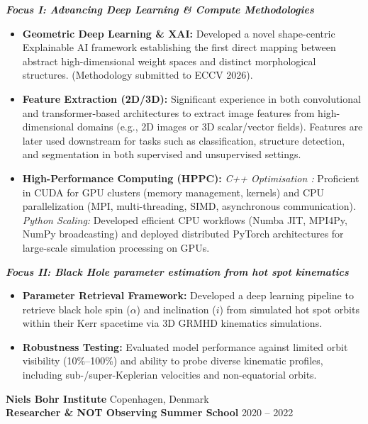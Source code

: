 \documentclass[11pt]{article}
\begin{document}
\vspace{3pt}
\noindent\textit{\textbf{Focus I: Advancing Deep Learning \& Compute Methodologies}}
\begin{itemize}[noitemsep, topsep=2pt, partopsep=0pt, parsep=2pt, leftmargin=1.5em]
    \item \textbf{Geometric Deep Learning \& XAI:} Developed a novel shape-centric Explainable AI framework establishing the first direct mapping between abstract high-dimensional weight spaces and distinct morphological structures. (Methodology submitted to ECCV 2026).
    
    \item \textbf{Feature Extraction (2D/3D):} Significant experience in both convolutional and transformer-based architectures to extract image features from high-dimensional domains (e.g., 2D images or 3D scalar/vector fields). Features are later used downstream for tasks such as classification, structure detection, and segmentation in both supervised and unsupervised settings.
    
    \item \textbf{High-Performance Computing (HPPC):} \textit{C++ Optimisation :} Proficient in CUDA for GPU clusters (memory management, kernels) and CPU parallelization (MPI, multi-threading, SIMD, asynchronous communication). \textit{Python Scaling:} Developed efficient CPU workflows (Numba JIT, MPI4Py, NumPy broadcasting) and deployed distributed PyTorch architectures for large-scale simulation processing on GPUs.
\end{itemize}

\vspace{3pt}
\noindent\textit{\textbf{Focus II: Black Hole parameter estimation from hot spot kinematics}}
\begin{itemize}[noitemsep, topsep=2pt, partopsep=0pt, parsep=2pt, leftmargin=1.5em]
    \item \textbf{Parameter Retrieval Framework:} Developed a deep learning pipeline to retrieve black hole spin ($\alpha$) and inclination ($i$) from simulated hot spot orbits within their Kerr spacetime via 3D GRMHD kinematics simulations.
    \item \textbf{Robustness Testing:} Evaluated model performance against limited orbit visibility (10\%--100\%) and ability to probe diverse kinematic profiles, including sub-/super-Keplerian velocities and non-equatorial orbits.
\end{itemize}

\vspace{10pt}
\noindent
\textbf{Niels Bohr Institute} \hfill Copenhagen, Denmark \\
\textbf{Researcher \& NOT Observing Summer School} \hfill 2020 -- 2022
\end{document}
